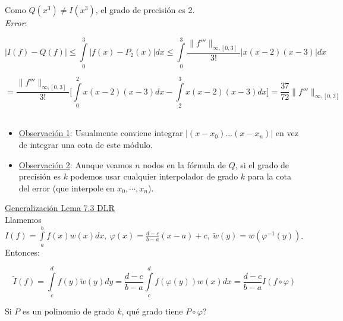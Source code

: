 Como $Q(x^{3}) \neq I(x^{3})$, el grado de precisi\'on es 2.\\

\textit{Error}:

$$|I(f) - Q(f)| \leq \int \limits_{0}^{3} |f(x) - P_{2}(x)| dx \leq 
\int \limits_{0}^{3} \frac{\|f'''\|_{\infty, [0, 3]}}{3!}|x(x - 2)(x - 3)|dx$$

$$ = \frac{\|f'''\|_{\infty, [0, 3]}}{3!} \bigg[\int \limits_{0}^{2}x(x - 2)(x - 3)dx - \int \limits_{2}^{3}x(x - 2)(x - 3)dx \bigg] = \frac{37}{72}\|f'''\|_{\infty, [0, 3]}$$\\

\begin{itemize}
	\item \underline{Observaci\'on 1}: Usualmente conviene integrar $|(x - x_{0})...(x - x_{n})|$ en vez de integrar una cota de este m\'odulo.
	
	\item \underline{Observaci\'on 2}: Aunque veamos $n$ nodos en la f\'ormula de $Q$, si el grado de precisi\'on es $k$ podemos usar cualquier interpolador de grado $k$ para la cota del error (que interpole en $x_{0}, \cdots, x_{n}$).\\
\end{itemize}

\underline{Generalizaci\'on Lema 7.3 DLR}\\

Llamemos $I(f) = \int \limits_{a}^{b} f(x)w(x)dx,\ \varphi(x) = \frac{d - c}{b - a}(x - a) + c,\ \tilde{w}(y) = w(\varphi^{-1}(y))$. Entonces:

$$\tilde{I}(f) = \int \limits_{c}^{d} f(y)\tilde{w}(y)dy = \frac{d - c}{b - a}\int \limits_{c}^{d} f(\varphi(y))w(x)dx
 = \frac{d - c}{b - a}I(f \circ \varphi)$$
 
Si $P$ es un polinomio de grado $k$, qu\'e grado tiene $P \circ \varphi$?
